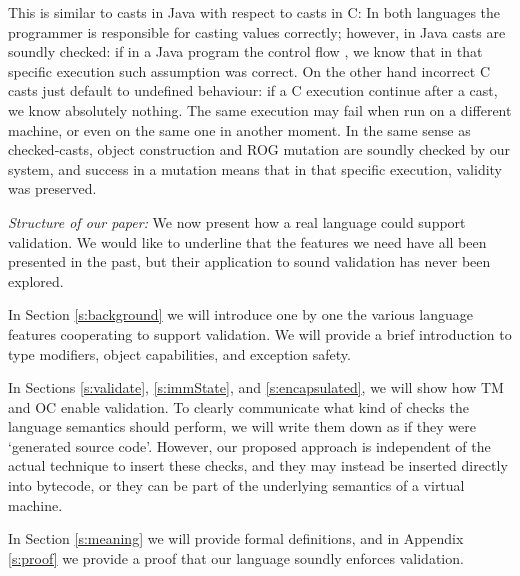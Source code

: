 This is similar to casts in Java with respect to casts in C:
In both languages the programmer is responsible for casting values correctly;
however, in Java casts are soundly checked: if in a Java program the control flow ,
we know that in that specific
execution such assumption was correct.
On the other hand incorrect C casts just default to undefined behaviour:
if a C execution continue after a cast, we know absolutely nothing. The same execution
may fail when run on a different machine, 
or even on the same one in another moment.
In the same sense as checked-casts, object construction and ROG mutation are soundly checked by our system,
and success in a mutation means that in that specific execution, validity was preserved.




%
%  
% 
%
%
%
%
%
%
%
%
%
%
%
%
%
%
%
%
%



\noindent\textit{Structure of our paper:} We now present how a real language could support
validation. 
We would like to underline that the
features we need have all been presented in the past, but their application to sound validation has never been explored.

In Section \ref{s:background} we will introduce one by one the various
language features cooperating
to support validation. %
We will provide a brief introduction to type modifiers, object capabilities, and exception safety.

In Sections \ref{s:validate}, \ref{s:immState}, and \ref{s:encapsulated}, we will show how TM and OC enable validation.
To clearly communicate what kind of checks the language semantics should perform,
 we will write them down as if they were `generated source code'.
However, our proposed approach is independent of the actual technique to insert these checks, and they may instead be inserted directly into bytecode, or they can be part of the underlying semantics of a virtual machine.

In Section \ref{s:meaning} we will provide formal definitions, and in Appendix \ref{s:proof} we provide  a proof that our language soundly enforces validation.




